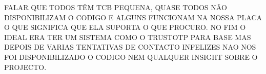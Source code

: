 FALAR QUE TODOS TÊM TCB PEQUENA, QUASE TODOS NÃO DISPONIBILIZAM O CODIGO E ALGUNS FUNCIONAM NA NOSSA PLACA O QUE SIGNIFICA QUE ELA SUPORTA O QUE PROCURO. NO FIM O IDEAL ERA TER UM SISTEMA COMO O TRUSTOTP PARA BASE MAS DEPOIS DE VARIAS TENTATIVAS DE CONTACTO INFELIZES NAO NOS FOI DISPONIBILIZADO O CODIGO NEM QUALQUER INSIGHT SOBRE O PROJECTO.
\begin{table}[t!]
	\centering
	\caption{Comparison between security mechanisms with and without a compromised Operating System (Android).}
	\label{tab:trustzonesystemscomparison}
\end{table}

\newpage



